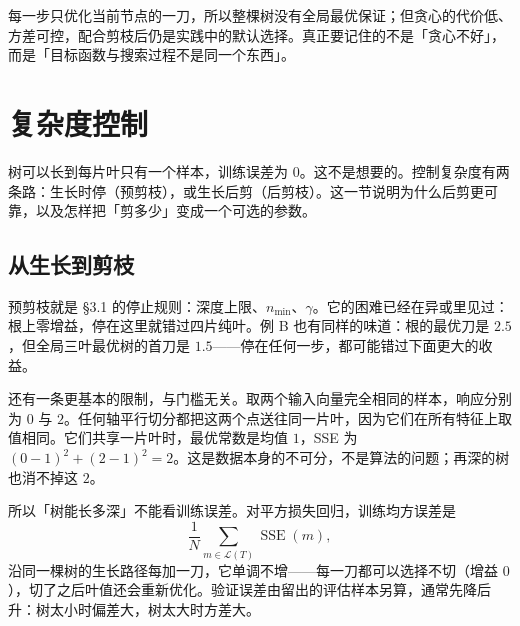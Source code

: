 \documentclass[11pt,a4paper,fontset=windows,zihao=-4]{ctexart}
\DeclareMathOperator{\SSE}{SSE}
\newcommand{\Lcal}{\mathcal{L}}
\begin{document}
\begin{keybox}[贪心的两句话]
每一步只优化当前节点的一刀，所以整棵树没有全局最优保证；但贪心的代价低、方差可控，配合剪枝后仍是实践中的默认选择。真正要记住的不是「贪心不好」，而是「目标函数与搜索过程不是同一个东西」。
\end{keybox}


\section{复杂度控制}

树可以长到每片叶只有一个样本，训练误差为 $0$。这不是想要的。控制复杂度有两条路：生长时停（预剪枝），或生长后剪（后剪枝）。这一节说明为什么后剪更可靠，以及怎样把「剪多少」变成一个可选的参数。

\subsection{从生长到剪枝}

预剪枝就是 §3.1 的停止规则：深度上限、$n_{\min}$、$\gamma$。它的困难已经在异或里见过：根上零增益，停在这里就错过四片纯叶。例 B 也有同样的味道：根的最优刀是 $2.5$，但全局三叶最优树的首刀是 $1.5$——停在任何一步，都可能错过下面更大的收益。

还有一条更基本的限制，与门槛无关。取两个输入向量完全相同的样本，响应分别为 $0$ 与 $2$。任何轴平行切分都把这两个点送往同一片叶，因为它们在所有特征上取值相同。它们共享一片叶时，最优常数是均值 $1$，SSE 为 $(0-1)^2+(2-1)^2=2$。这是数据本身的不可分，不是算法的问题；再深的树也消不掉这 $2$。

所以「树能长多深」不能看训练误差。对平方损失回归，训练均方误差是
\begin{equation}
  \frac1N\sum_{m\in\Lcal(T)}\SSE(m),
  \label{eq:trainmse}
\end{equation}
沿同一棵树的生长路径每加一刀，它单调不增——每一刀都可以选择不切（增益 $0$），切了之后叶值还会重新优化。验证误差由留出的评估样本另算，通常先降后升：树太小时偏差大，树太大时方差大。
\end{document}
